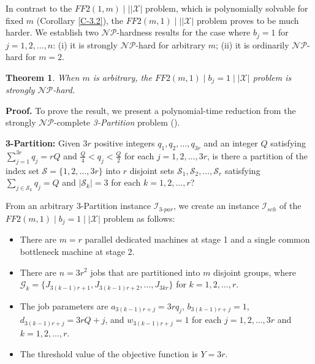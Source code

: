 \documentclass[12pt, eqno, limlimits]{article}
\newtheorem{theorem}{Theorem}[section]
\begin{document}
\begin{sloppypar}
        In contrast to the $FF2(1, m)\mid \mid |\mathcal{X}|$ problem, which is polynomially solvable for fixed $m$ (Corollary \ref{C-3.2}), the $FF2(m, 1) \mid \mid |\mathcal{X}|$ problem proves to be much harder. We establish two $\mathcal{NP}$-hardness results for the case where $b_j=1$ for $j = 1, 2, \ldots, n$: (i) it is strongly $\mathcal{NP}$-hard for arbitrary $m$; (ii) it is ordinarily $\mathcal{NP}$-hard for $m = 2$.
        
        \begin{theorem} \label{T-4.1}
            When $m$ is arbitrary, the $FF2(m, 1) \mid b_j=1 \mid |\mathcal{X}|$ problem is strongly $\mathcal{NP}$-hard. 
        \end{theorem}
        
        \noindent \textbf{Proof.} To prove the result, we present a polynomial-time reduction from the strongly $\mathcal{NP}$-complete \emph{3-Partition} problem (\citealp{Garey1979computer}). 
        
        \textbf{3-Partition:} Given $3r$ positive integers $q_1, q_2, \ldots, q_{3r}$ and an integer $Q$ satisfying $\sum_{j=1}^{3r} q_j=r Q$ and $\frac{Q}{4} < q_j < \frac{Q}{2}$ for each $j=1, 2, \ldots, 3r$, is there a partition of the index set $\mathcal{S}=\{1, 2, \ldots, 3r\}$ into $r$ disjoint sets $\mathcal{S}_1, \mathcal{S}_2, \ldots, \mathcal{S}_r$ satisfying $\sum_{j \in \mathcal{S}_k} q_j =Q$ and $|\mathcal{S}_k|=3$ for each $k=1, 2, \ldots, r$?
        
        From an arbitrary 3-Partition instance $\mathcal{I}_{3\text{-}par}$, we create an instance $\mathcal{I}_{sch}$ of the $FF2(m, 1) \mid  b_j=1 \mid |\mathcal{X}|$ problem as follows: 
        \begin{itemize}
            \item There are $m=r$ parallel dedicated machines at stage 1 and a single common bottleneck machine at stage 2.
            
            \item There are $n=3 r^2$ jobs that are partitioned into $m$ disjoint groups, where $\mathcal{G}_k=\{J_{3(k-1)r+1}, J_{3(k-1)r+2}, \ldots, J_{3kr}\}$ for $k=1, 2, \ldots, r$.
            
            \item The job parameters are $a_{3(k-1)r+j}=3r q_j$, $b_{3(k-1)r+j}=1$, $d_{3(k-1)r+j}=3rQ+j$, and $w_{3(k-1)r+j}=1$ for each $j=1, 2, \ldots, 3r$ and $k=1, 2, \ldots, r$.
            
            \item The threshold value of the objective function is $Y=3r$.
            

\end{itemize}
\end{sloppypar}
\end{document}
